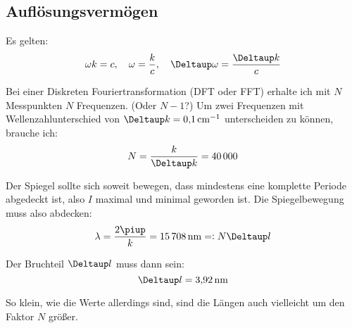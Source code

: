\subsection{Auflösungsvermögen}

Es gelten:
\[
	\omega k = c
	\eqnsep
	\omega = \frac kc
	\eqnsep
	\Deltaup \omega = \frac{\Deltaup k}c
\]

Bei einer Diskreten Fouriertransformation (DFT oder FFT) erhalte ich mit $N$
Messpunkten $N$ Frequenzen. (Oder $N-1$?) Um zwei Frequenzen mit
Wellenzahlunterschied von $\Deltaup k = \SI{.1}{\per\centi\meter}$
unterscheiden zu können, brauche ich:
\[
	N = \frac{k}{\Deltaup k} = \num{40000}
\]

Der Spiegel sollte sich soweit bewegen, dass mindestens eine komplette Periode
abgedeckt ist, also $I$ maximal und minimal geworden ist. Die Spiegelbewegung
muss also abdecken:
\[
	\lambda = \frac{2\piup}{k} = \SI{15708}{\nano\meter} =: N \Deltaup l
\]

Der Bruchteil $\Deltaup l$ muss dann sein:
\[
	\Deltaup l = \SI{3.92}{\nano\meter}
\]

So klein, wie die Werte allerdings sind, sind die Längen auch vielleicht um den
Faktor $N$ größer.


\IfFileExists{\bibliographyfile}{
	
}{}



